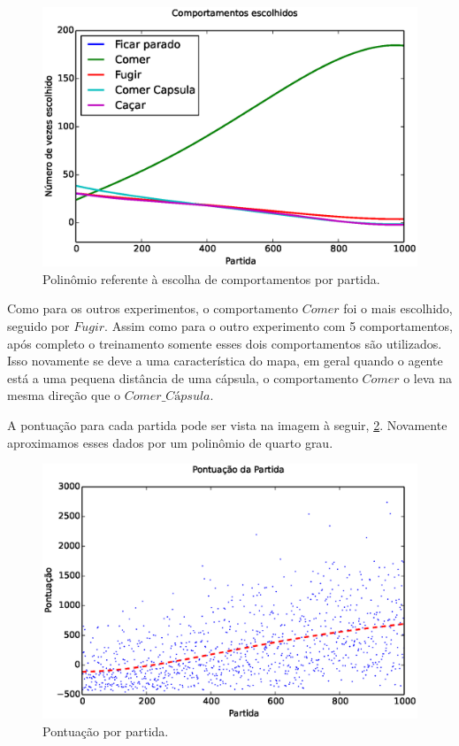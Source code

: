 \begin{figure}[H]
    \centering
    \includegraphics[width=\linewidth]{images/5_behaviors_original_map/chosen_behaviors_pol}
    \caption{Polinômio referente à escolha de comportamentos por partida.}
    \label{img:5ComportamentosMapaOriginal:ComportamentosEscolhidosPolinômio}
\end{figure}

Como para os outros experimentos, o comportamento $ Comer $ foi o mais escolhido, seguido por $ Fugir $. Assim como para o outro experimento com 5 comportamentos, após completo o treinamento somente esses dois comportamentos são utilizados. Isso novamente se deve a uma característica do mapa, em geral quando o agente está a uma pequena distância de uma cápsula, o comportamento $ Comer $ o leva na mesma direção que o $ \textit{Comer\_Cápsula} $.

A pontuação para cada partida pode ser vista na imagem à seguir, \ref{img:5ComportamentosMapaOriginal:PontuacaoPorPartida}. Novamente aproximamos esses dados por um polinômio de quarto grau.

\begin{figure}[H]
    \centering
    \includegraphics[width=\linewidth]{images/5_behaviors_original_map/match_scores____pol}
    \caption{Pontuação por partida.}
    \label{img:5ComportamentosMapaOriginal:PontuacaoPorPartida}
\end{figure}

